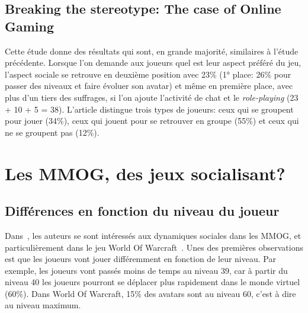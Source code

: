 \documentclass[11pt,a4paper]{article}
\begin{document}
\subsection{Breaking the stereotype: The case of Online Gaming}
Cette étude donne des résultats qui sont, en grande majorité, similaires à l'étude précédente. Lorsque l'on demande aux joueurs quel est leur aspect préféré du jeu, l'aspect sociale se retrouve en deuxième position avec 23\% (1° place: 26\% pour passer des niveaux et faire évoluer son avatar) et même en première place, avec plus d'un tiers des suffrages, si l'on ajoute l'activité de chat et le \textit{role-playing} (23 + 10 + 5 = 38). L'article distingue trois types de joueurs: ceux qui se groupent pour jouer (34\%), ceux qui jouent pour se retrouver en groupe (55\%) et ceux qui ne se groupent pas (12\%).



\section{Les MMOG, des jeux socialisant?}
\subsection{Différences en fonction du niveau du joueur}
Dans~\cite{1124834}, les auteurs se sont intéressés aux dynamiques sociales dans les MMOG, et particulièrement dans le jeu World Of Warcraft~\cite{wow}. Unes des premières observations est que les joueurs vont jouer différemment en fonction de leur niveau. Par exemple, les joueurs vont passés moins de temps au niveau 39, car à partir du niveau 40 les joueurs pourront se déplacer plus rapidement dans le monde virtuel (60\%). Dans World Of Warcraft, 15\% des avatars sont au niveau 60, c'est à dire au niveau maximum.
\end{document}
